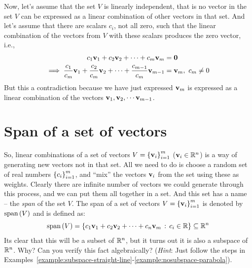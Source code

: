 Now, let's assume that the set $V$ is linearly independent, that is no vector in the set $V$ can be expressed as a linear combination of other vectors in that set. And let's assume that there are scalars $c_i$, not all zero, such that the linear combination of the vectors from $V$ with these scalars produces the zero vector, i.e.,
\[ \begin{split}
    c_1 \mathbf{v}_1 + c_2 \mathbf{v}_2 + \cdots + c_m \mathbf{v}_m &= \mathbf{0} \\
    \implies \frac{c_1}{c_m} \mathbf{v}_1 + \frac{c_2}{c_m} \mathbf{v}_2 + \cdots + \frac{c_{m-1}}{c_m}\mathbf{v}_{m-1} &= \mathbf{v}_m, \,\, c_m \neq 0
\end{split} \]
But this a contradiction because we have just expressed $\mathbf{v}_m$ is expressed as a linear combination of the vectors $\mathbf{v}_1, \mathbf{v}_2, \cdots \mathbf{v}_{m-1}$.

\section{Span of a set of vectors}
So, linear combinations of a set of vectors $V = \left\{ \mathbf{v}_i \right\}_{i=1}^{m}$ ($\mathbf{v}_i \in \mathbb{R}^n$) is a way of generating new vectors not in that set. All we need to do is choose a random set of real numbers $\left\{ c_i \right\}_{i=1}^{m}$, and ``mix'' the vectors $\mathbf{v}_i$ from the set using these as weights. Clearly there are infinite number of vectors we could generate through this process, and we can put them all together in a set. And this set has a name -- the \textit{span} of the set $V$. The span of a set of vectors $V = \left\{ \mathbf{v}_i \right\}_{i=1}^{m}$ is denoted by $\text{span}\left( V \right)$ and is defined as:
\begin{equation}
    \text{span}\left( V \right) = \left\{ c_1 \mathbf{v}_1 + c_2 \mathbf{v}_2 + \cdots + c_n \mathbf{v}_m \, : \, c_i \in \mathbb{R} \right\} \subseteq \mathbb{R}^n
    \label{eq:span-vec}
\end{equation}
Its clear that this will be a subset of $\mathbb{R}^n$, but it turns out it is also a subspace of $\mathbb{R}^n$. Why? Can you verify this fact algebraically? (\textit{Hint}: Just follow the steps in Examples~\ref{example:subspace-straight-line}-\ref{example:nosubspace-parabola}).

